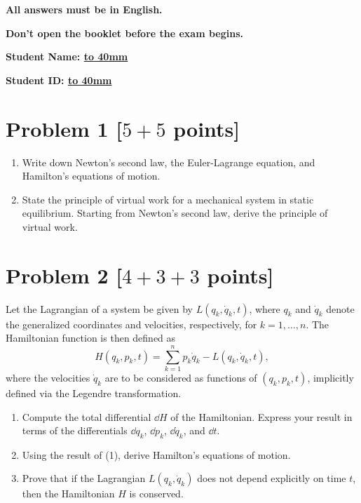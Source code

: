 \documentclass[11pt, a4paper]{article} %
\begin{document}
{\Large \bf \color{orange} \hspace{2em} All answers must be in English.}
\vspace*{2mm}

{\Large \bf \color{orange} \hspace{2em} Don't open the booklet before the exam begins.}
\vspace{5cm}

\begin{center}
{\Large \bf Student Name: \underline{\hbox to 40mm{}}}
\vspace*{8mm}

{\Large \bf Student ID: \underline{\hbox to 40mm{}}}
\vspace*{2mm}
\end{center}

\newpage
\section*{Problem 1 [$5 + 5$ points]} 
\begin{enumerate}
  \item[(1)] Write down Newton’s second law, the Euler-Lagrange equation, and Hamilton’s equations of motion. 

  \item[(2)] State the principle of virtual work for a mechanical system in static equilibrium. Starting from Newton’s second law, derive the principle of virtual work.

  \end{enumerate}


\newpage 
\section*{Problem 2 [$4+3+3$ points]} 
Let the Lagrangian of a system be given by $L(q_k, \dot{q}_k, t)$, where $q_k$ and $\dot{q}_k$ denote the generalized coordinates and velocities, respectively, for $k = 1, \dots, n$. 
The Hamiltonian function is then defined as
\[
H(q_k, p_k, t) = \sum_{k=1}^n p_k \dot{q}_k - L(q_k, \dot{q}_k, t),
\]
where the velocities $\dot{q}_k$ are to be considered as functions of $(q_k, p_k, t)$, implicitly defined via the Legendre transformation.

\begin{enumerate}
  \item[(1)] Compute the total differential $\dd H$ of the Hamiltonian. Express your result in terms of the differentials $\dd q_k$, $\dd p_k$, $\dd\dot{q}_k$, and $\dd t$. 
  
  \item[(2)] Using the result of (1), derive Hamilton's equations of motion.
  
  \item[(3)] Prove that if the Lagrangian $L(q_k, \dot{q}_k)$ does not depend explicitly on time $t$, then the Hamiltonian $H$ is conserved.

\end{enumerate}
\end{document}
